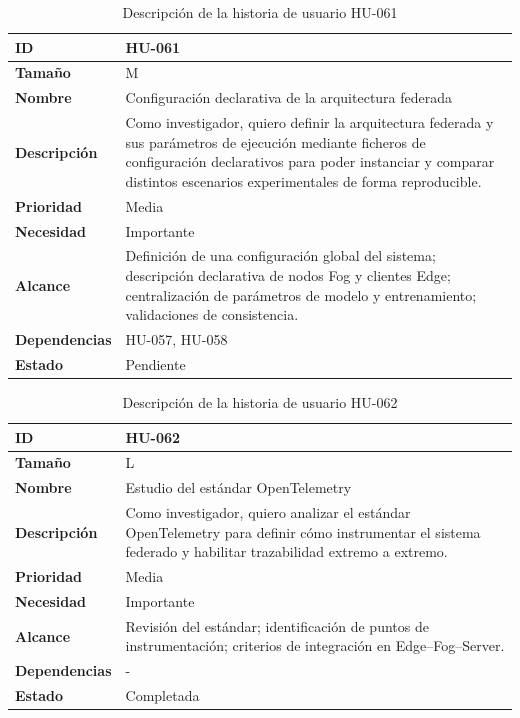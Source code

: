 \documentclass{report}
\begin{document}
\begin{table}[H]
\centering
\caption{Descripción de la historia de usuario HU-061}
\label{tab:hu061}
\begin{tabular}{|l|p{12cm}|}
\hline
\textbf{ID} & HU-061 \\ \hline
\textbf{Tamaño} & M \\ \hline
\textbf{Nombre} & Configuración declarativa de la arquitectura federada \\ \hline
\textbf{Descripción} &
Como investigador, quiero definir la arquitectura federada y sus parámetros de ejecución mediante ficheros de configuración declarativos para poder instanciar y comparar distintos escenarios experimentales de forma reproducible. \\ \hline
\textbf{Prioridad} & Media \\ \hline
\textbf{Necesidad} & Importante \\ \hline
\textbf{Alcance} &
Definición de una configuración global del sistema; descripción declarativa de nodos Fog y clientes Edge; centralización de parámetros de modelo y entrenamiento; validaciones de consistencia. \\ \hline
\textbf{Dependencias} & HU-057, HU-058 \\ \hline
\textbf{Estado} & Pendiente \\ \hline
\end{tabular}
\end{table}



\begin{table}[H]
\centering
\caption{Descripción de la historia de usuario HU-062}
\label{tab:hu062}
\begin{tabular}{|l|p{12cm}|}
\hline
\textbf{ID} & HU-062 \\ \hline
\textbf{Tamaño} & L \\ \hline
\textbf{Nombre} & Estudio del estándar OpenTelemetry \\ \hline
\textbf{Descripción} &
Como investigador, quiero analizar el estándar OpenTelemetry para definir cómo instrumentar el sistema federado y habilitar trazabilidad extremo a extremo. \\ \hline
\textbf{Prioridad} & Media \\ \hline
\textbf{Necesidad} & Importante \\ \hline
\textbf{Alcance} &
Revisión del estándar; identificación de puntos de instrumentación; criterios de integración en Edge--Fog--Server. \\ \hline
\textbf{Dependencias} & - \\ \hline
\textbf{Estado} & Completada \\ \hline
\end{tabular}
\end{table}
\end{document}
